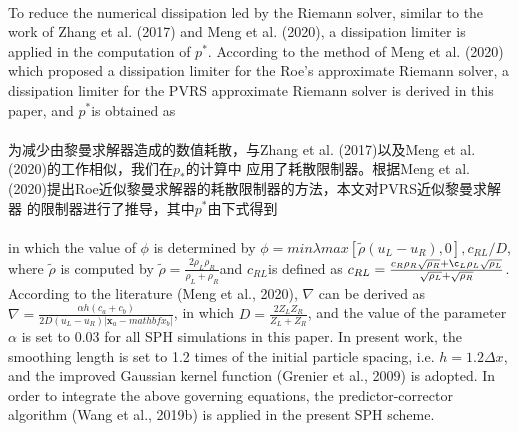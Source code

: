 \documentclass[UTF8]{ctexart}
\begin{document}
{{\paragraph{\quad}To reduce the numerical dissipation led by the Riemann solver, similar to the work 
                of Zhang et al. (2017) and Meng et al. (2020), a dissipation limiter is applied in the 
                computation of $p^*$. According to the method of Meng et al. (2020) which proposed a 
                dissipation limiter for the Roe's approximate Riemann solver, a dissipation limiter 
                for the PVRS approximate Riemann solver is derived in this paper, and $p^*$is obtained as
\paragraph{\quad}为减少由黎曼求解器造成的数值耗散，与Zhang et al. (2017)以及Meng et al. (2020)的工作相似，我们在$p_*$的计算中
                应用了耗散限制器。根据Meng et al. (2020)提出Roe近似黎曼求解器的耗散限制器的方法，本文对PVRS近似黎曼求解器
                的限制器进行了推导，其中$p^*$由下式得到
    

\paragraph{\quad}in which the value of $\phi$ is determined by $\phi = min{λmax[\tilde{ρ}(u_L-u_R), 0], c_{RL}/D}$, 
                 where $\tilde{\rho}$ is computed by $\tilde{ρ} = \frac{2 \rho_L \rho_R}{\rho_L + \rho_R} $and $c_{RL}$is defined as
                 $c_{RL} = \frac{c_R \rho_R \sqrt{\rho_R} + \c_L \rho_L \sqrt{\rho_L}}{\sqrt{\rho_L}+\sqrt{\rho_R}}$.
                 According to the literature (Meng et al., 2020), 
                 $\nabla$ can be derived as $\nabla =\frac{ \alpha h (c_a+c_b) }{2D(u_L-u_R)|\mathbf{x}_a-mathbf{x}_b|}$, 
                 in which $D = \frac{2Z_L Z_R}{Z_L + Z_R}$, and the value of the parameter $\alpha$ 
                 is set to 0.03 for all SPH simulations in this paper. 
                 In present work, the smoothing length is set to 1.2 times of the initial particle 
                 spacing, i.e. $h = 1.2 \Delta x$, and the improved Gaussian kernel function (Grenier et al., 2009) 
                 is adopted. In order to integrate the above governing equations, the predictor-corrector 
                 algorithm (Wang et al., 2019b) is applied in the present SPH scheme.
}}
\end{document}
